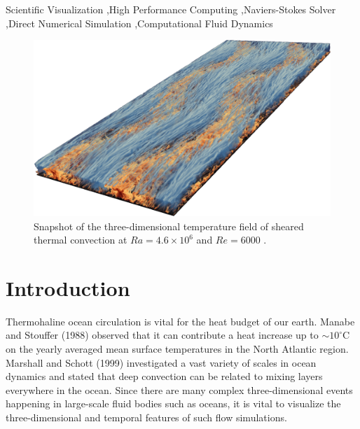 \documentclass[5p,times]{elsarticle}
\begin{document}
\begin{frontmatter}
\begin{abstract}
\end{abstract}

\begin{keyword}

Scientific Visualization \sep High Performance Computing \sep Naviers-Stokes Solver \sep Direct Numerical Simulation \sep Computational Fluid Dynamics

\end{keyword}

\end{frontmatter}


\begin{figure}[!hbt]
	\centering
	\includegraphics[width=\linewidth]{flowfield}%
	\caption{\label{fig:flowfield} Snapshot of the three-dimensional temperature field of sheared thermal convection at $ Ra=4.6 \times 10^6 $ and $ Re=6000 $ \cite{bla18}.}
\end{figure}

\section{Introduction}
\label{sec:Introduction}

Thermohaline ocean circulation \cite{rah00} is vital for the heat budget of our earth. Manabe and Stouffer (1988) \cite{man88} observed that it can contribute a heat increase up to $ \sim 10 ^ \circ $C on the yearly averaged mean surface temperatures in the North Atlantic region. Marshall and Schott (1999) \cite{mar99} investigated a vast variety of scales in ocean dynamics and stated that deep convection can be related to mixing layers everywhere in the ocean. Since there are many complex three-dimensional events happening in large-scale fluid bodies such as oceans, it is vital to visualize the three-dimensional and temporal features of such flow simulations.
\end{document}
